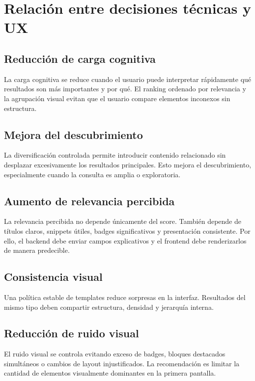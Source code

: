 \documentclass[12pt,a4paper]{article}
\begin{document}
\section{Relación entre decisiones técnicas y UX}

\subsection{Reducción de carga cognitiva}

La carga cognitiva se reduce cuando el usuario puede interpretar rápidamente qué resultados son más importantes y por qué. El ranking ordenado por relevancia y la agrupación visual evitan que el usuario compare elementos inconexos sin estructura.

\subsection{Mejora del descubrimiento}

La diversificación controlada permite introducir contenido relacionado sin desplazar excesivamente los resultados principales. Esto mejora el descubrimiento, especialmente cuando la consulta es amplia o exploratoria.

\subsection{Aumento de relevancia percibida}

La relevancia percibida no depende únicamente del score. También depende de títulos claros, snippets útiles, badges significativos y presentación consistente. Por ello, el backend debe enviar campos explicativos y el frontend debe renderizarlos de manera predecible.

\subsection{Consistencia visual}

Una política estable de templates reduce sorpresas en la interfaz. Resultados del mismo tipo deben compartir estructura, densidad y jerarquía interna.

\subsection{Reducción de ruido visual}

El ruido visual se controla evitando exceso de badges, bloques destacados simultáneos o cambios de layout injustificados. La recomendación es limitar la cantidad de elementos visualmente dominantes en la primera pantalla.
\end{document}
